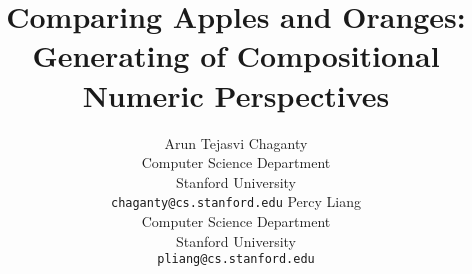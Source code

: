 \documentclass[11pt]{article}
\title{Comparing Apples and Oranges: Generating of Compositional Numeric Perspectives}
\author{
  Arun Tejasvi Chaganty \\
  Computer Science Department \\
  Stanford University \\
  {\tt chaganty@cs.stanford.edu}
\And%
	Percy Liang \\
  Computer Science Department \\
  Stanford University \\
  {\tt pliang@cs.stanford.edu}
}
\date{}
\begin{document}
\maketitle

\begin{abstract}

\end{abstract}










\end{document}
